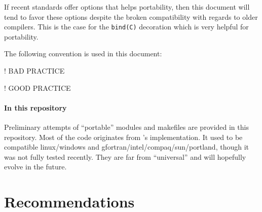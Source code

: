 \documentclass{article}
\begin{document}
If recent standards offer options that helps portability, then this document will tend to favor these options despite the broken compatibility with regards to older compilers. This is the case for the \texttt{bind(C)} decoration which is very helpful for portability.

The following convention is used in this document:\\
\begin{codea}
! BAD PRACTICE
\end{codea}
\begin{codeb}
! GOOD PRACTICE
\end{codeb}


\paragraph{In this repository} Preliminary attempts of ``portable'' modules and makefiles are provided in this repository.  Most of the code originates from 's implementation. It used to be compatible linux/windows and gfortran/intel/compaq/sun/portland, though it was not fully tested recently.
They are far from ``universal'' and will hopefully evolve in the future.

\section{Recommendations}


\end{document}
